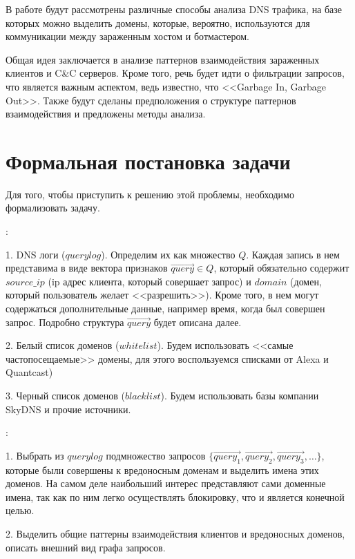 \documentclass[a4paper,14pt]{extreport} %
\begin{document}
В работе будут рассмотрены различные способы анализа DNS трафика, на базе которых можно выделить домены, которые, вероятно, используются для коммуникации между зараженным хостом и ботмастером.

Общая идея заключается в анализе паттернов взаимодействия зараженных клиентов и C\&C серверов. Кроме того, речь будет идти о фильтрации запросов, что является важным аспектом, ведь известно, что <<Garbage In, Garbage Out>>. Также будут сделаны предположения о структуре паттернов взаимодействия и предложены методы анализа.

\chapter{Формальная постановка задачи}
Для того, чтобы приступить к решению этой проблемы, необходимо формализовать задачу.

{:}
		
1. DNS логи ($querylog$). Определим их как множество $Q$. Каждая запись в нем представима в виде вектора признаков $\vec{query}$$\in$$Q$, который обязательно содержит $source\_ip$ (ip адрес клиента, который совершает запрос) и $domain$ (домен, который пользователь желает <<разрешить>>). Кроме того, в нем могут содержаться дополнительные данные, например время, когда был совершен запрос. Подробно структура $\vec{query}$ будет описана далее.
		
2. Белый список доменов ($whitelist$). Будем использовать <<самые частопосещаемые>> домены, для этого воспользуемся списками от Alexa и Quantcast)
		
3. Черный список доменов ($blacklist$). Будем использовать базы компании SkyDNS и прочие источники.
	
{:} 
	
1. Выбрать из $querylog$ подмножество 
запросов $\{\vec{query_1}, \vec{query_2}, \vec{query_3}, \dots\}$, которые были совершены к вредоносным доменам и выделить имена этих доменов. На самом деле наибольший интерес представляют сами доменные имена, так как по ним легко осуществлять блокировку, что и является конечной целью.
	
2. Выделить общие паттерны взаимодействия клиентов и вредоносных доменов, описать внешний вид графа запросов.

\newpage
\end{document}
